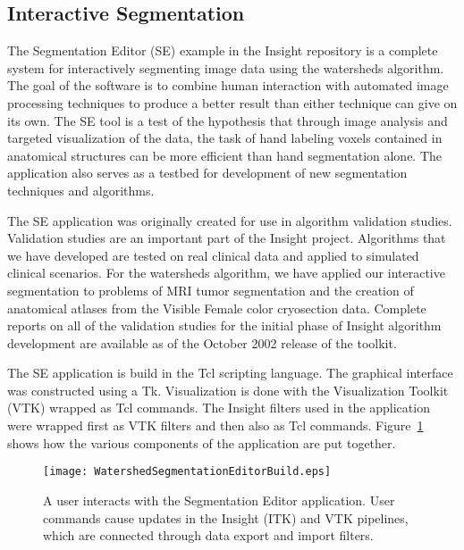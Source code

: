\subsection{Interactive Segmentation}
\label{sec:SegmentationEditorWatersheds}
The Segmentation Editor (SE) example in the Insight repository is a complete
system for interactively segmenting image data using the watersheds algorithm.
The goal of the software is to combine human interaction with automated image
processing techniques to produce a better result than either technique can give
on its own. The SE tool is a test of the hypothesis that through image analysis
and targeted visualization of the data, the task of hand labeling voxels
contained in anatomical structures can be more efficient than hand segmentation
alone.  The application also serves as a testbed for development of new
segmentation techniques and algorithms.

The SE application was originally created for use in algorithm validation
studies.  Validation studies are an important part of the Insight project.
Algorithms that we have developed are tested on real clinical data and applied
to simulated clinical scenarios.  For the watersheds algorithm, we have applied
our interactive segmentation to problems of MRI tumor segmentation and the
creation of anatomical atlases from the Visible Female color cryosection data.
Complete reports on all of the validation studies for the initial phase of
Insight algorithm development are available as of the October 2002 release of
the toolkit.

The SE application is build in the Tcl scripting language.  The graphical
interface was constructed using a Tk.  Visualization is done with the
Visualization Toolkit (VTK) wrapped as Tcl commands.  The Insight filters used
in the application were wrapped first as VTK filters and then also as Tcl
commands.  Figure~\ref{fig:SegmentationEditorBuildWatersheds} shows how the
various components of the application are put together.

\begin{figure}
\centering
\texttt{[image: WatershedSegmentationEditorBuild.eps]}
\caption{A user interacts with the Segmentation Editor application.  User
commands cause updates in the Insight (ITK) and VTK pipelines, which are
connected through data export and import filters.}
\protect\label{fig:SegmentationEditorBuildWatersheds}
\end{figure}

